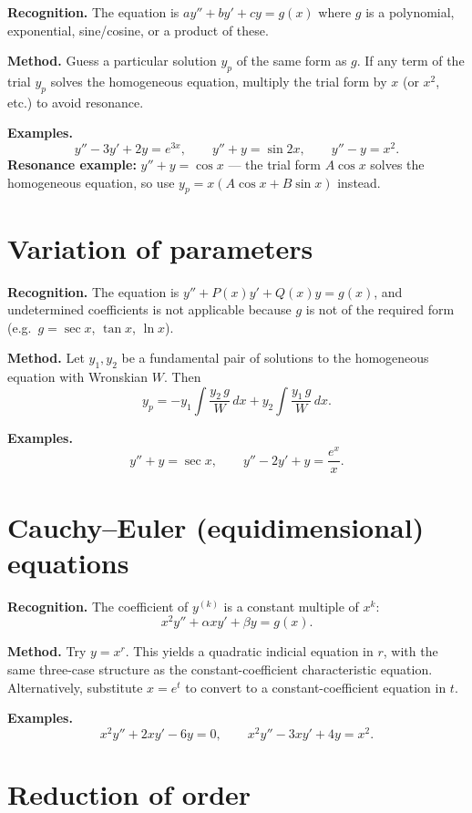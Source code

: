 \documentclass{essay}
\begin{document}
\textbf{Recognition.}  The equation is $ay'' + by' + cy = g(x)$ where $g$ is a polynomial, exponential, sine/cosine, or a product of these.

\textbf{Method.}  Guess a particular solution $y_p$ of the same form as $g$.  If any term of the trial $y_p$ solves the homogeneous equation, multiply the trial form by $x$ (or $x^2$, etc.) to avoid resonance.

\textbf{Examples.}
\[
  y'' - 3y' + 2y = e^{3x}, \qquad
  y'' + y = \sin 2x, \qquad
  y'' - y = x^2.
\]
\textbf{Resonance example:} $y'' + y = \cos x$ — the trial form $A\cos x$ solves the homogeneous equation, so use $y_p = x(A\cos x + B\sin x)$ instead.

\section{Variation of parameters}

\textbf{Recognition.}  The equation is $y'' + P(x)y' + Q(x)y = g(x)$, and undetermined coefficients is not applicable because $g$ is not of the required form (e.g.\ $g = \sec x$, $\tan x$, $\ln x$).

\textbf{Method.}  Let $y_1, y_2$ be a fundamental pair of solutions to the homogeneous equation with Wronskian $W$.  Then
\[
  y_p = -y_1 \int \frac{y_2\, g}{W}\,dx + y_2 \int \frac{y_1\, g}{W}\,dx.
\]

\textbf{Examples.}
\[
  y'' + y = \sec x, \qquad y'' - 2y' + y = \frac{e^x}{x}.
\]

\section{Cauchy--Euler (equidimensional) equations}

\textbf{Recognition.}  The coefficient of $y^{(k)}$ is a constant multiple of $x^k$:
\[
  x^2 y'' + \alpha x y' + \beta y = g(x).
\]

\textbf{Method.}  Try $y = x^r$.  This yields a quadratic indicial equation in $r$, with the same three-case structure as the constant-coefficient characteristic equation.  Alternatively, substitute $x = e^t$ to convert to a constant-coefficient equation in $t$.

\textbf{Examples.}
\[
  x^2 y'' + 2xy' - 6y = 0, \qquad x^2 y'' - 3xy' + 4y = x^2.
\]

\section{Reduction of order}
\end{document}
